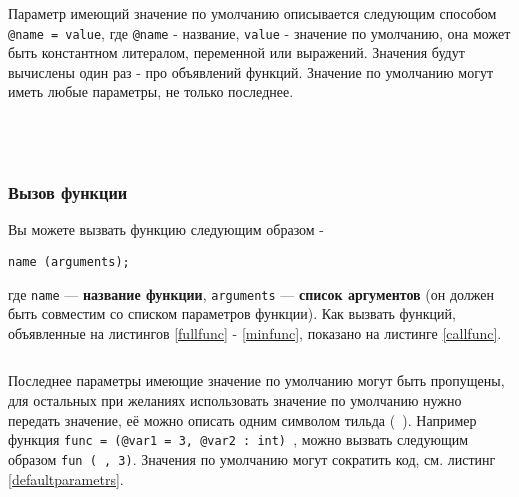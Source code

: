 Параметр имеющий значение по умолчанию описывается следующим способом \texttt{@name = value}, где \texttt{@name} - название, \texttt{value} - значение по умолчанию, она может быть константном литералом, переменной или выражений. Значения будут вычислены один раз - про объявлений функций. Значение по умолчанию могут иметь любые параметры, не только последнее.

\begin{sourcecode}
	\label{fullfunc}
	\inputminted[linenos]{icl}{../sources/fullfunc.icL}
\end{sourcecode}

\begin{sourcecode}
	\label{noargsfunc}
	\inputminted[linenos]{icl}{../sources/noargsfunc.icL}
\end{sourcecode}

\begin{sourcecode}
	\label{notypefunc}
	\inputminted[linenos]{icl}{../sources/notypefunc.icL}
\end{sourcecode}

\begin{sourcecode}
	\label{minfunc}
	\inputminted[linenos]{icl}{../sources/minfunc.icL}
\end{sourcecode}

\subsubsection{Вызов функции}

Вы можете вызвать функцию следующим образом -
\begin{verbatim}
name (arguments);
\end{verbatim}
где \texttt{name} — {\bf название функции}, \texttt{arguments} — {\bf список аргументов} (он должен быть совместим со списком параметров функции). Как вызвать функций, объявленные на листингов \ref{fullfunc} - \ref{minfunc}, показано на листинге \ref{callfunc}. 

\begin{sourcecode}
	\label{callfunc}
	\inputminted[linenos]{icl}{../sources/callfunc.icL}
\end{sourcecode}

Последнее параметры имеющие значение по умолчанию могут быть пропущены, для остальных при желаниях использовать значение по умолчанию нужно передать \void{} значение, её можно описать одним символом тильда (\texttt{~}). Например функция \texttt{func = (@var1 = 3, @var2 : int) {}}, можно вызвать следующим образом \texttt{fun (~, 3)}. Значения по умолчанию могут сократить код, см. листинг \ref{defaultparametrs}.

